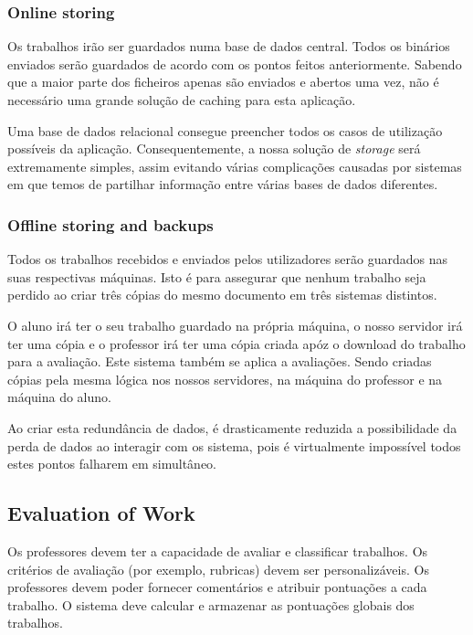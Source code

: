 \documentclass[10pt]{article}
\begin{document}
\subsubsection{Online storing}
Os trabalhos irão ser guardados numa  base de dados central. Todos os binários enviados serão guardados
de acordo com os pontos feitos anteriormente. Sabendo que a maior parte dos ficheiros apenas são enviados
e abertos uma vez, não é necessário uma grande solução de caching para esta aplicação.

Uma base de dados relacional consegue preencher todos os casos de utilização possíveis da aplicação.
Consequentemente, a nossa solução de \textit{storage} será extremamente simples, assim evitando várias
complicações causadas por sistemas em que temos de partilhar informação entre várias bases de dados diferentes.

\subsubsection{Offline storing and backups}
Todos os trabalhos recebidos e enviados pelos utilizadores serão guardados nas suas respectivas máquinas.
Isto é para assegurar que nenhum trabalho seja perdido ao criar três cópias do mesmo documento em três sistemas
distintos.

O aluno irá ter o seu trabalho guardado na própria máquina, o nosso servidor irá ter uma cópia e o professor
irá ter uma cópia criada apóz o download do trabalho para a avaliação.
Este sistema também se aplica a avaliações. Sendo criadas cópias pela mesma lógica nos nossos servidores,
na máquina do professor e na máquina do aluno.

Ao criar esta redundância de dados, é drasticamente reduzida a possibilidade da perda de dados ao interagir
com os sistema, pois é virtualmente impossível todos estes pontos falharem em simultâneo.

\newpage

\subsection{Evaluation of Work}
Os professores devem ter a capacidade de avaliar e classificar trabalhos. 
Os critérios de avaliação (por exemplo, rubricas) devem ser personalizáveis. 
Os professores devem poder fornecer comentários e atribuir pontuações a cada trabalho. 
O sistema deve calcular e armazenar as pontuações globais dos trabalhos.
\end{document}
